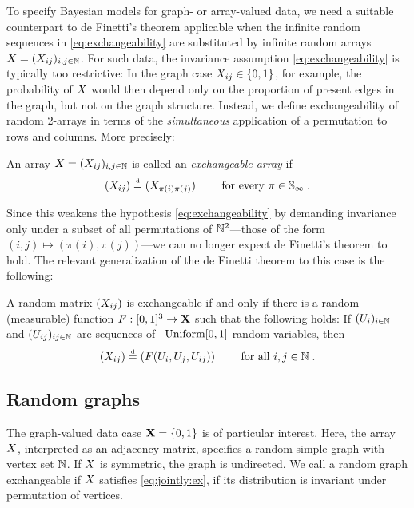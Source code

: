 To specify Bayesian models for graph- or array-valued data, we need a suitable counterpart to de Finetti's theorem applicable
when the infinite random sequences in \eqref{eq:exchangeability} are substituted by infinite random arrays $X=(X_{ij})_{i,j\in\mathbb{N}}$.
For such data, the invariance assumption \eqref{eq:exchangeability} is typically too restrictive:
In the graph case $X_{ij}\in\lbrace 0,1\rbrace$, for example, the probability of $X$ would then depend only on the proportion of present edges
in the graph, but not on the graph structure. Instead, we define exchangeability of random 2-arrays
in terms of the \emph{simultaneous} application of a permutation to rows and columns. More precisely:
\begin{definition}
  An array $X=(X_{ij})_{i,j\in\mathbb{N}}$ is called an \emph{exchangeable array} if 
  \begin{equation}
    \label{eq:jointly:ex}
    (X_{ij})\stackrel{\mbox{\tiny d}}{=}(X_{\pi(i)\pi(j)}) \qquad\text{ for every }\pi\in\mathbb{S}_{\infty}\;.
  \end{equation}
\end{definition}
Since this weakens the hypothesis \eqref{eq:exchangeability} by demanding invariance only under a subset of all permutations of
$\mathbb{N}^2$---those of the form $(i,j)\mapsto(\pi(i),\pi(j))$---we can no longer expect de Finetti's theorem to hold.
The relevant generalization of the de Finetti theorem to this case is the following:
\begin{thm}
  \label{theorem:ah}
  A random matrix $(X_{ij})$ is exchangeable if and only if there is a random (measurable) function ${F:[0,1]^3\rightarrow\mathbf{X}}$ such that the following holds: If $(U_i)_{i\in\mathbb{N}}$ and $(U_{ij})_{ij\in\mathbb{N}}$ are \iid sequences of ~$\mbox{\rm Uniform}[0,1]$ random variables, then
  \begin{equation}
    \label{eq:ah}
    (X_{ij})\stackrel{\mbox{\tiny d}}{=} (F(U_i,U_j,U_{ij})) \qquad\text{ for all }i,j\in\mathbb{N}\;.
  \end{equation}
\end{thm}


\subsection{Random graphs}

The graph-valued data case $\mathbf{X}=\lbrace{0,1}\rbrace$ is of particular interest. Here, the array $X$, interpreted as 
an adjacency matrix, specifies a random simple graph with vertex set $\mathbb{N}$. If $X$ is symmetric, the graph is undirected. We call a 
random graph exchangeable if $X$ satisfies \eqref{eq:jointly:ex}, \ie if its distribution is invariant under permutation of vertices.

